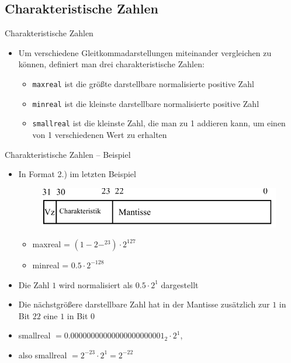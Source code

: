 \documentclass[12pt%
,aspectratio=169%
]{beamer}
\begin{document}
\subsection{Charakteristische Zahlen}
\begin{frame}{Charakteristische Zahlen}
\begin{itemize}
	\item Um verschiedene Gleitkommadarstellungen miteinander vergleichen zu können, definiert man drei
charakteristische Zahlen:
	\begin{itemize}
		\item \texttt{maxreal} ist die größte darstellbare normalisierte positive Zahl
		\item \texttt{minreal} ist die kleinste darstellbare normalisierte positive Zahl
		\item \texttt{smallreal} ist die kleinste Zahl, die man zu 1 addieren kann, um einen von 1 verschiedenen Wert zu erhalten
	\end{itemize}
\end{itemize}
\end{frame}

\begin{frame}{Charakteristische Zahlen -- Beispiel}
\begin{itemize}
	\item In Format 2.) im letzten Beispiel
	\begin{figure}
	\includegraphics[scale=0.3]{pictures/format_b}
	\end{figure}
	\begin{itemize}
		\item maxreal = $(1 - 2-^{23})\cdot 2^{127}$
		\item minreal = $0.5 \cdot 2^{-128}$
	\end{itemize}
	\item Die Zahl $1$ wird normalisiert als $0.5 \cdot 2^1$ dargestellt
	\item Die nächstgrößere darstellbare Zahl hat in der Mantisse zusätzlich zur $1$ in Bit $22$ eine $1$ in Bit $0$
	\item smallreal $= 0.00000000000000000000001_2 \cdot 2^1$,
	\item also smallreal $= 2^{-23} \cdot 2^1 = 2^{-22}$
\end{itemize}
\end{frame}
\end{document}

